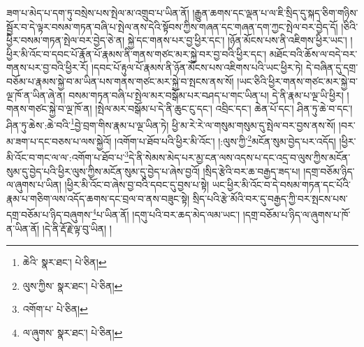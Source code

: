 ཟག་པ་མེད་པ་དག་ཏུ་བསྲེས་པས་སྤེལ་མ་འགྲུབ་པ་ཡིན་ནོ། །རྒྱུན་ཆགས་དང་ལྡན་པ་ལ་ཇི་སྲིད་དུ་སྐད་ཅིག་གཉིས་སྦྱོར་བ་དེ་ལྟར་བསམ་གཏན་བཞི་པ་སྤེལ་ནས་དེའི་སྟོབས་ཀྱིས་གཞན་དང་གཞན་དག་ཀྱང་སྤེལ་བར་བྱེད་དོ། །ཅིའི་ཕྱིར་བསམ་གཏན་སྤེལ་བར་བྱེད་ཅེ་ན། སྐྱེ་དང་གནས་པར་བྱ་ཕྱིར་དང་། །ཉོན་མོངས་པས་ནི་འཇིགས་ཕྱིར་ཡང་། །ཕྱིར་མི་འོང་བ་དབང་པོ་རྣོན་པོ་རྣམས་ནི་གནས་གཙང་མར་སྐྱེ་བར་བྱ་བའི་ཕྱིར་དང་། མཐོང་བའི་ཆོས་ལ་བདེ་བར་གནས་པར་བྱ་བའི་ཕྱིར་རོ། །དབང་པོ་རྟུལ་པོ་རྣམས་ནི་ཉོན་མོངས་པས་འཇིགས་པའི་ཡང་ཕྱིར་ཏེ། དེ་བཞིན་དུ་དགྲ་བཅོམ་པ་རྣམས་སྐྱེ་བ་མ་ཡིན་པས་གནས་གཙང་མར་སྐྱེ་བ་སྤངས་ནས་སོ། །ཡང་ཅིའི་ཕྱིར་གནས་གཙང་མར་སྐྱེ་བ་ལྔ་ཁོ་ན་ཡིན་ཞེ་ན། བསམ་གཏན་བཞི་པ་སྤེལ་མར་བསྒོམ་པར་བཤད་པ་གང་ཡིན་པ། དེ་ནི་རྣམ་པ་ལྔ་ཡི་ཕྱིར། །གནས་གཙང་སྐྱེ་བ་ལྔ་ཁོ་ན། །སྤེལ་མར་བསྒོམ་པ་དེ་ནི་ཆུང་ངུ་དང་། འབྲིང་དང་། ཆེན་པོ་དང་། ཤིན་ཏུ་ཆེ་བ་དང་། ཤིན་ཏུ་ཆེས་:ཆེ་བའི་\footnote{ཆེའི་  སྣར་ཐང་།  པེ་ཅིན། }བྱེ་བྲག་གིས་རྣམ་པ་ལྔ་ཡིན་ཏེ། ཕྱི་མ་རེ་རེ་ལ་གསུམ་གསུམ་དུ་སྤེལ་བར་བྱས་ནས་སོ། །བར་མ་ཟག་པ་དང་བཅས་པ་ལས་སྐྱེའོ། །འགོག་པ་ཐོབ་པའི་ཕྱིར་མི་འོང་། །:ལུས་ཀྱི་\footnote{ལུས་ཀྱིས་  སྣར་ཐང་།  པེ་ཅིན། }མངོན་སུམ་བྱེད་པར་འདོད། །ཕྱིར་མི་འོང་བ་གང་ལ་ལ་:འགོག་པ་ཐོབ་པ་\footnote{འགོག་པ་  པེ་ཅིན། }དེ་ནི་སེམས་མེད་པར་མྱ་ངན་ལས་འདས་པ་དང་འདྲ་བ་ལུས་ཀྱིས་མངོན་སུམ་དུ་བྱེད་པའི་ཕྱིར་ལུས་ཀྱིས་མངོན་སུམ་དུ་བྱེད་པ་ཞེས་བྱའོ། །སྲིད་རྩེའི་བར་ཆ་བརྒྱད་ཟད་པ། །དགྲ་བཅོམ་ཉིད་ལ་ཞུགས་པ་ཡིན། །ཕྱིར་མི་འོང་བ་ཞེས་བྱ་བའི་དབང་དུ་བྱས་པ་སྟེ། ཡང་ཕྱིར་མི་འོང་བ་དེ་བསམ་གཏན་དང་པོའི་རྣམ་པ་གཅིག་ལས་འདོད་ཆགས་དང་བྲལ་བ་ནས་བཟུང་སྟེ། སྲིད་པའི་རྩེ་མོའི་བར་དུ་བརྒྱད་ཀྱི་བར་སྤངས་པས་དགྲ་བཅོམ་པ་ཉིད་བཞུགས་\footnote{ལ་ཞུགས་  སྣར་ཐང་།  པེ་ཅིན། }པ་ཡིན་ནོ། །དགུ་པའི་བར་ཆད་མེད་ལམ་ཡང་། །དགྲ་བཅོམ་པ་ཉིད་ལ་ཞུགས་པ་ཁོ་ན་ཡིན་ནོ། །དེ་ནི་རྡོ་རྗེ་ལྟ་བུ་ཡིན། །
